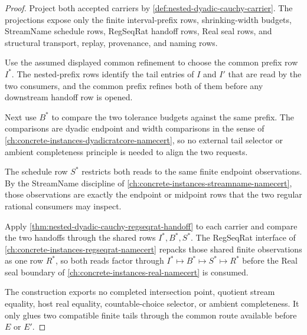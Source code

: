 \begin{proof}
Project both accepted carriers by \autoref{def:nested-dyadic-cauchy-carrier}. The projections expose only the finite interval-prefix rows, shrinking-width budgets, StreamName schedule rows, RegSeqRat handoff rows, Real seal rows, and structural transport, replay, provenance, and naming rows.

Use the assumed displayed common refinement to choose the common prefix row $I^*$. The nested-prefix rows identify the tail entries of $I$ and $I'$ that are read by the two consumers, and the common prefix refines both of them before any downstream handoff row is opened.

Next use $B^*$ to compare the two tolerance budgets against the same prefix. The comparisons are dyadic endpoint and width comparisons in the sense of \autoref{ch:concrete-instances-dyadicratcore-namecert}, so no external tail selector or ambient completeness principle is needed to align the two requests.

The schedule row $S^*$ restricts both reads to the same finite endpoint observations. By the StreamName discipline of \autoref{ch:concrete-instances-streamname-namecert}, those observations are exactly the endpoint or midpoint rows that the two regular rational consumers may inspect.

Apply \autoref{thm:nested-dyadic-cauchy-regseqrat-handoff} to each carrier and compare the two handoffs through the shared rows $I^*,B^*,S^*$. The RegSeqRat interface of \autoref{ch:concrete-instances-regseqrat-namecert} repacks those shared finite observations as one row $R^*$, so both reads factor through $I^*\mapsto B^*\mapsto S^*\mapsto R^*$ before the Real seal boundary of \autoref{ch:concrete-instances-real-namecert} is consumed.

The construction exports no completed intersection point, quotient stream equality, host real equality, countable-choice selector, or ambient completeness. It only glues two compatible finite tails through the common route available before $E$ or $E'$.
\end{proof}

